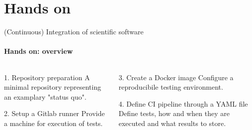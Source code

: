 \section{Hands on}

\begin{frame}{(Continuous) Integration of scientific software}
    \framesubtitle{Hands on: overview}
    \begin{columns}
    \begin{column}{0.48\textwidth}
        \begin{exampleblock}{1. Repository preparation}
            A minimal repository representing an examplary
            "status quo".
        \end{exampleblock}
        \begin{block}{2. Setup a Gitlab runner}
            Provide a machine for execution of tests.
        \end{block}
    \end{column}

    \begin{column}{0.48\textwidth}
        \begin{block}{3. Create a Docker image}
            Configure a reproducibile testing environment.
        \end{block}
        \begin{block}{4. Define CI pipeline through a YAML file}
            Define tests, how and when they are executed and what
            results to store.
        \end{block}
    \end{column}
    \end{columns}
\end{frame}
